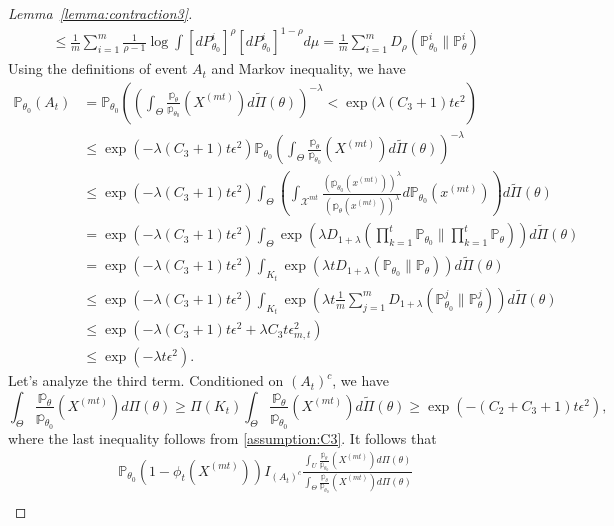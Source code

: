 \documentclass[10pt,a4paper]{amsart}
\newcommand\bP{\mathbb{P}}
\newcommand\bp{\mathbb{p}}
\newcommand{\X}{\mathcal{X}}
\begin{document}
\begin{proof}[Lemma~\ref{lemma:contraction3}]
\begin{align*}
   &\leq \frac{1}{m} \sum_{i = 1}^m \frac{1}{\rho - 1} \log \int [dP_{\theta_0}^i]^\rho [dP_{\theta_0}^i]^{1-\rho} d \mu  = \frac{1}{m} \sum_{i = 1}^m  D_\rho(\bP_{\theta_0}^i \parallel \bP_\theta^i) 
\end{align*}
Using the definitions of event $A_t$ and Markov inequality, we have
\begin{align*}
    \bP_{\theta_0} (A_t) &=  \bP_{\theta_0}\left(\left(\int_\Theta \frac{\bp_\theta}{\bp_{\theta_0}}(X^{(mt)}) d \tilde \Pi(\theta) \right)^{-\lambda } < \exp(\lambda(C_3 + 1) t \epsilon^2 \right)  \\
    &\leq \exp(-\lambda (C_3 + 1) t \epsilon^2)  \bP_{\theta_0}\left(\int_\Theta \frac{\bp_\theta}{\bp_{\theta_0}}(X^{(mt)}) d \tilde \Pi(\theta) \right)^{-\lambda } \\
    &\leq \exp(-\lambda(C_3 + 1) t \epsilon^2) \int_\Theta \left( \int_{\X^{mt}}\frac{(\bp_{\theta_0}(x^{(mt)}))^{\lambda }}{(\bp_\theta(x^{(mt)}))^{\lambda } }  d \bP_{\theta_0}(x^{(mt)})\right) d \tilde \Pi(\theta) \\
    &= \exp(-\lambda(C_3 + 1) t \epsilon^2) \int_\Theta \exp(\lambda  D_{1 + \lambda}(\prod_{k = 1}^t  \bP_{\theta_0} \parallel \prod_{k = 1}^t\bP_\theta)) d \tilde \Pi(\theta) \\
    &= \exp(-\lambda(C_3 + 1) t \epsilon^2) \int_{K_t} \exp(\lambda  t  D_{1 + \lambda}(  \bP_{\theta_0} \parallel \bP_\theta)) d \tilde \Pi(\theta) \\
    &\leq \exp(-\lambda(C_3 + 1) t \epsilon^2) \int_{K_t} \exp(\lambda t \frac{1}{m} \sum_{j = 1}^m D_{1 + \lambda}(\bP_{\theta_0}^j \parallel \bP_\theta^j)) d \tilde \Pi(\theta) \\
    &\leq \exp(- \lambda(C_3 + 1) t \epsilon^2 + \lambda C_3 t \epsilon_{m,t}^2) \\
    &\leq \exp(-\lambda t \epsilon^2). 
\end{align*}
Let's analyze the third term. Conditioned on $(A_t)^c$, we have
\begin{equation*}
\int_{\Theta} \frac{\bp_\theta}{\bp_{\theta_0}}(X^{(mt)}) d \Pi(\theta) \geq \Pi(K_t)  \int_{\Theta} \frac{\bp_\theta}{\bp_{\theta_0}}(X^{(mt)}) d \tilde \Pi(\theta)  \geq \exp(-(C_2 + C_3 + 1) t \epsilon^2), 
\end{equation*}
where the last inequality follows from \ref{assumption:C3}. It follows that
\begin{align*}
  &\bP_{\theta_0} (1 - \phi_t(X^{(mt)})) I_{(A_t)^c} \frac{\int_{U} \frac{\bp_\theta}{\bp_{\theta_0}}(X^{(mt)}) d \Pi(\theta)}{\int_{\Theta} \frac{\bp_\theta}{\bp_{\theta_0}}(X^{(mt)}) d \Pi(\theta)} \\

\end{align*}
\end{proof}
\end{document}
